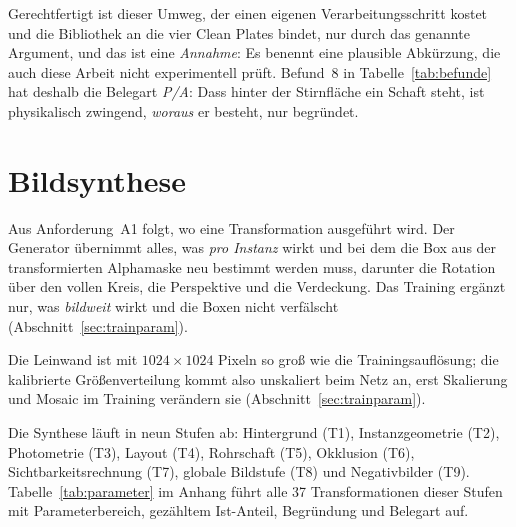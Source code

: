 Gerechtfertigt ist dieser Umweg, der einen eigenen Verarbeitungsschritt kostet
und die Bibliothek an die vier Clean Plates bindet, nur durch das genannte
Argument, und das ist eine \emph{Annahme}: Es benennt eine plausible Abkürzung,
die auch diese Arbeit nicht experimentell prüft. Befund~8 in
Tabelle~\ref{tab:befunde} hat deshalb die Belegart \emph{P/A}: Dass hinter der
Stirnfläche ein Schaft steht, ist physikalisch zwingend, \emph{woraus} er
besteht, nur begründet.

\section{Bildsynthese}
\label{sec:synthese}

\label{sec:arbeitsteilung} Aus Anforderung~A1 folgt,
wo eine Transformation ausgeführt wird. Der Generator übernimmt alles, was
\emph{pro Instanz} wirkt und bei dem die Box aus der transformierten Alphamaske
neu bestimmt werden muss, darunter die Rotation über den vollen Kreis, die
Perspektive und die Verdeckung. Das Training ergänzt nur, was \emph{bildweit}
wirkt und die Boxen nicht verfälscht (Abschnitt~\ref{sec:trainparam}).

Die Leinwand ist mit $1024\times1024$ Pixeln so groß wie die
Trainingsauflösung; die kalibrierte Größenverteilung kommt also unskaliert beim
Netz an, erst Skalierung und Mosaic im Training verändern sie
(Abschnitt~\ref{sec:trainparam}).

Die Synthese läuft in neun Stufen ab: Hintergrund (T1), Instanzgeometrie (T2),
Photometrie (T3), Layout (T4), Rohrschaft (T5), Okklusion (T6),
Sichtbarkeitsrechnung (T7), globale Bildstufe (T8) und Negativbilder (T9).
Tabelle~\ref{tab:parameter} im Anhang führt alle 37 Transformationen dieser
Stufen mit Parameterbereich, gezähltem Ist-Anteil, Begründung und Belegart
auf.


